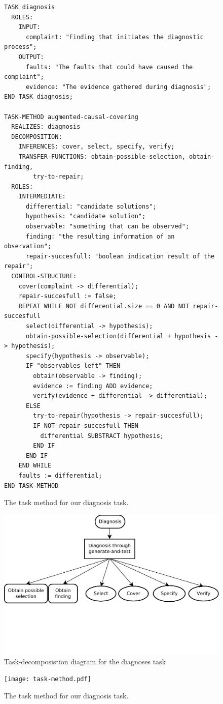 \begin{figure}[htbp]
\begin{verbatim}
TASK diagnosis
  ROLES:
    INPUT:
      complaint: "Finding that initiates the diagnostic process";
    OUTPUT:
      faults: "The faults that could have caused the complaint";
      evidence: "The evidence gathered during diagnosis";
END TASK diagnosis;

TASK-METHOD augmented-causal-covering
  REALIZES: diagnosis
  DECOMPOSITION:
    INFERENCES: cover, select, specify, verify;
    TRANSFER-FUNCTIONS: obtain-possible-selection, obtain-finding,
        try-to-repair;
  ROLES:
    INTERMEDIATE:
      differential: "candidate solutions";
      hypothesis: "candidate solution";
      observable: "something that can be observed";
      finding: "the resulting information of an observation";
      repair-succesfull: "boolean indication result of the repair";
  CONTROL-STRUCTURE:
    cover(complaint -> differential);
    repair-succesfull := false;
    REPEAT WHILE NOT differential.size == 0 AND NOT repair-succesfull
      select(differential -> hypothesis);
      obtain-possible-selection(differential + hypothesis -> hypothesis);
      specify(hypothesis -> observable);
      IF "observables left" THEN
        obtain(observable -> finding);
        evidence := finding ADD evidence;
        verify(evidence + differential -> differential);
      ELSE
        try-to-repair(hypothesis -> repair-succesfull);
        IF NOT repair-succesfull THEN
          differential SUBSTRACT hypothesis;
        END IF
      END IF
    END WHILE
    faults := differential;
END TASK-METHOD
\end{verbatim}
\caption{The task method for our diagnosis task.}
\label{txt:taskMethod}
\end{figure}

\begin{figure}[htbp]
	\centering
	\includegraphics[width=1.00\textwidth]{taskDecomposition.pdf}
	\caption{Task-decomposistion diagram for the diagnoses task}
	\label{fig:taskDecomposition}
\end{figure}


\begin{figure}[htbp]
    \centering
    \texttt{[image: task-method.pdf]}
    \caption{The task method for our diagnosis task.}
    \label{fig:taskMethod}
\end{figure}
